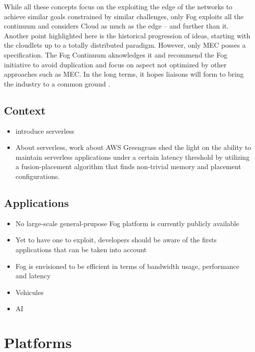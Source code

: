 \documentclass[11pt]{sdm}
\begin{document}
While all these concepts focus on the exploiting the edge of the networks to achieve similar goals constrained by similar challenges, only Fog exploits all the continuum and considers Cloud as much as the edge -- and further than it. Another point highlighted here is the historical progression of ideas, starting with the cloudlets up to a totally distributed paradigm. However, only \gls{MEC} posses a specification. The Fog Continuum aknowledges it and recommend the Fog initiative to avoid duplication and focus on aspect not optimized by other approaches such as \gls{MEC}. In the long terms, it hopes liaisons will form to bring the industry to a common ground \cite{ieee_standards_association_ieee_2018}.

\subsection {Context}
\begin{itemize}
	\item introduce serverless
	\item About serverless,  work about AWS Greengrass shed the light on the ability to maintain serverless applications under a certain latency threshold by utilizing a fusion-placement algorithm that finds non-trivial memory and placement configurations.
\end{itemize}

\subsection {Applications}
\begin{itemize}
	\item No large-scale general-prupose Fog platform is currently publicly available \cite{ahmed_fog_2019}
	\item Yet to have one to exploit, developers should be aware of the firsts applications that can be taken into account
	\item Fog is envisioned to be efficient in terms of bandwidth usage, performance and latency
\end{itemize}
\begin{itemize}
    \item Vehicules
    \item \gls{AI}
\end{itemize}

\section{Platforms}
\end{document}
